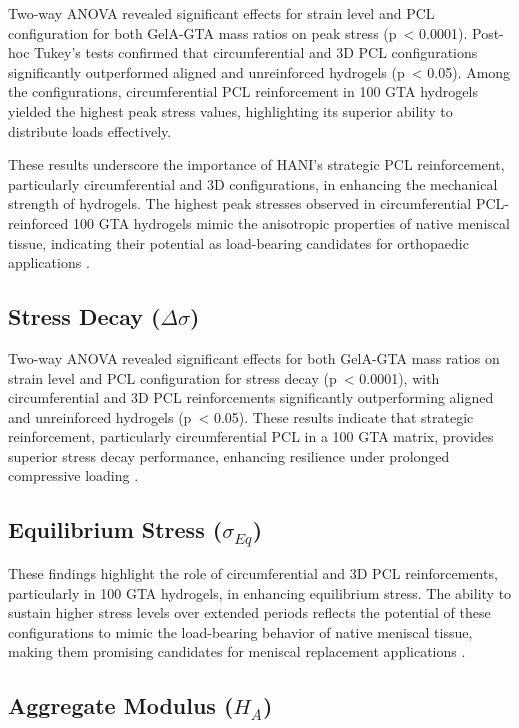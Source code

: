 Two-way ANOVA revealed significant effects for strain level and PCL configuration for both GelA-GTA mass ratios on peak stress (p~< 0.0001). Post-hoc Tukey's tests confirmed that circumferential and 3D PCL configurations significantly outperformed aligned and unreinforced hydrogels (p~< 0.05). Among the configurations, circumferential PCL reinforcement in 100 GTA hydrogels yielded the highest peak stress values, highlighting its superior ability to distribute loads effectively.

These results underscore the importance of HANI's strategic PCL reinforcement, particularly circumferential and 3D configurations, in enhancing the mechanical strength of hydrogels. The highest peak stresses observed in circumferential PCL-reinforced 100 GTA hydrogels mimic the anisotropic properties of native meniscal tissue, indicating their potential as load-bearing candidates for orthopaedic applications \cite{MartinSeitz2013,Visser2015}.

\subsection{Stress Decay ($\Delta\sigma$)}

Two-way ANOVA revealed significant effects for both GelA-GTA mass ratios on strain level and PCL configuration for stress decay (p~< 0.0001), with circumferential and 3D PCL reinforcements significantly outperforming aligned and unreinforced hydrogels (p~< 0.05). These results indicate that strategic reinforcement, particularly circumferential PCL in a 100 GTA matrix, provides superior stress decay performance, enhancing resilience under prolonged compressive loading \cite{Patel2019,Morejon2020,Norberg2021,Roberts2011}.

\subsection{Equilibrium Stress ($\sigma_{Eq}$)}
These findings highlight the role of circumferential and 3D PCL reinforcements, particularly in 100 GTA hydrogels, in enhancing equilibrium stress. The ability to sustain higher stress levels over extended periods reflects the potential of these configurations to mimic the load-bearing behavior of native meniscal tissue, making them promising candidates for meniscal replacement applications \cite{MartinSeitz2013,Maes2006,Korhonen2002,Boschetti2004,Norberg2021,Roberts2011}.

\subsection{Aggregate Modulus ($H_A$)}

